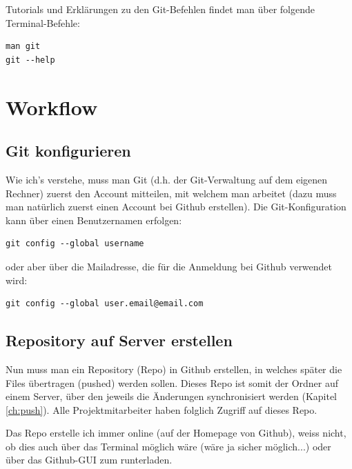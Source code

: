 \documentclass[twoside, 11pr]{article}
\begin{document}
Tutorials und Erklärungen zu den Git-Befehlen findet man über folgende Terminal-Befehle:

\begin{lstlisting}
man git
git --help
\end{lstlisting}

\section{Workflow}

\subsection{Git konfigurieren}

Wie ich's verstehe, muss man Git (d.h. der Git-Verwaltung auf dem eigenen Rechner) zuerst den Account mitteilen, mit welchem man arbeitet (dazu muss man natürlich zuerst einen Account bei Github erstellen). Die Git-Konfiguration kann über einen Benutzernamen erfolgen:

\begin{lstlisting}
git config --global username
\end{lstlisting}

\noindent
oder aber über die Mailadresse, die für die Anmeldung bei Github verwendet wird:

\begin{lstlisting}
git config --global user.email@email.com
\end{lstlisting}


\subsection{Repository auf Server erstellen}\label{ch:gitRepo}

Nun muss man ein Repository (Repo) in Github erstellen, in welches später die Files übertragen (pushed) werden sollen. Dieses Repo ist somit der Ordner auf einem Server, über den jeweils die Änderungen synchronisiert werden (Kapitel \ref{ch:push}). Alle Projektmitarbeiter haben folglich Zugriff auf dieses Repo. \par
Das Repo erstelle ich immer online (auf der Homepage von Github), weiss nicht, ob dies auch über das Terminal möglich wäre (wäre ja sicher möglich...) oder über das Github-GUI zum runterladen.
\end{document}
